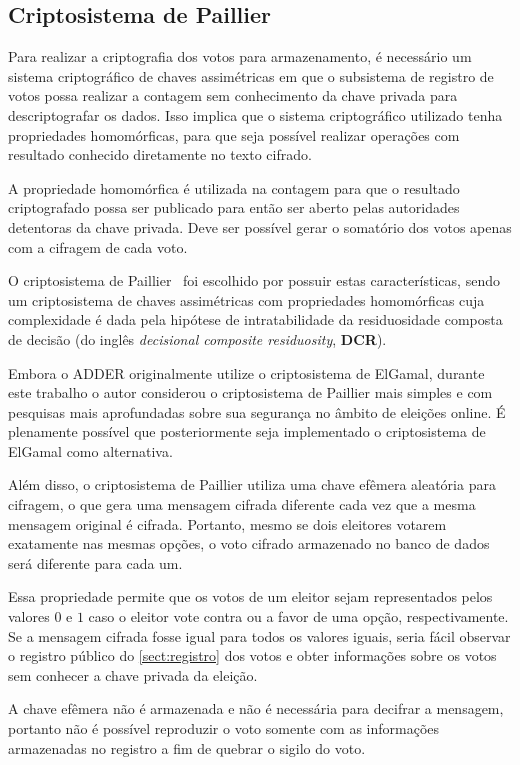 \subsection{Criptosistema de Paillier}

Para realizar a criptografia dos votos para armazenamento, é necessário um
sistema criptográfico de chaves assimétricas em que o subsistema de registro de
votos possa realizar a contagem sem conhecimento da chave privada para
descriptografar os dados. Isso implica que o sistema criptográfico utilizado
tenha propriedades homomórficas, para que seja possível realizar operações com
resultado conhecido diretamente no texto cifrado.

A propriedade homomórfica é utilizada na contagem para que o resultado
criptografado possa ser publicado para então ser aberto pelas autoridades
detentoras da chave privada. Deve ser possível gerar o somatório dos votos
apenas com a cifragem de cada voto.

O criptosistema de Paillier~\cite{paillier1999public} foi escolhido por possuir
estas características, sendo um criptosistema de chaves assimétricas com
propriedades homomórficas cuja complexidade é dada pela hipótese de
intratabilidade da residuosidade composta de decisão (do inglês
\textit{decisional composite residuosity}, \textbf{DCR}).

Embora o ADDER originalmente utilize o criptosistema de ElGamal, durante este
trabalho o autor considerou o criptosistema de Paillier mais simples e com
pesquisas mais aprofundadas sobre sua segurança no âmbito de eleições online. É
plenamente possível que posteriormente seja implementado o criptosistema de
ElGamal como alternativa.

Além disso, o criptosistema de Paillier utiliza uma chave efêmera aleatória
para cifragem, o que gera uma mensagem cifrada diferente cada vez que a mesma
mensagem original é cifrada. Portanto, mesmo se dois eleitores votarem
exatamente nas mesmas opções, o voto cifrado armazenado no banco de dados será
diferente para cada um.

Essa propriedade permite que os votos de um eleitor sejam representados pelos
valores $0$ e $1$ caso o eleitor vote contra ou a favor de uma opção,
respectivamente. Se a mensagem cifrada fosse igual para todos os valores
iguais, seria fácil observar o registro público do \autoref{sect:registro} dos
votos e obter informações sobre os votos sem conhecer a chave privada da
eleição.

A chave efêmera não é armazenada e não é necessária para decifrar a mensagem,
portanto não é possível reproduzir o voto somente com as informações
armazenadas no registro a fim de quebrar o sigilo do voto.
